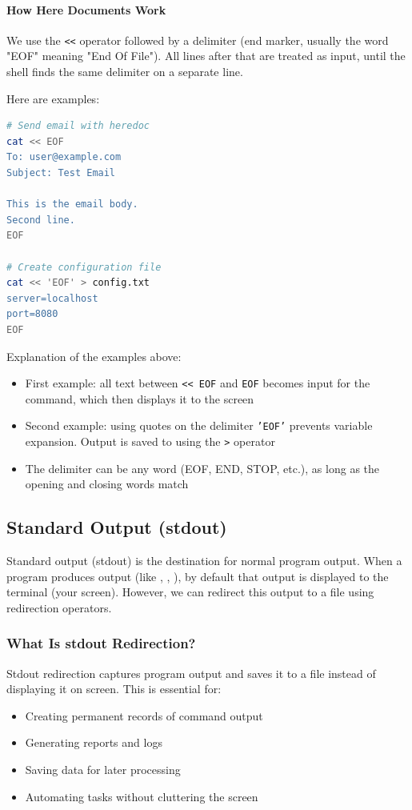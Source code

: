 \paragraph{How Here Documents Work}

We use the \texttt{<<} operator followed by a delimiter (end marker, usually the word "EOF" meaning "End Of File"). All lines after that are treated as input, until the shell finds the same delimiter on a separate line.

Here are examples:

\begin{lstlisting}[language=bash, caption={Using here document}]
# Send email with heredoc
cat << EOF
To: user@example.com
Subject: Test Email

This is the email body.
Second line.
EOF

# Create configuration file
cat << 'EOF' > config.txt
server=localhost
port=8080
EOF
\end{lstlisting}

Explanation of the examples above:
\begin{itemize}
	\item First example: all text between \texttt{<< EOF} and \texttt{EOF} becomes input for the  command, which then displays it to the screen
	\item Second example: using quotes on the delimiter \texttt{'EOF'} prevents variable expansion. Output is saved to  using the \texttt{>} operator
	\item The delimiter can be any word (EOF, END, STOP, etc.), as long as the opening and closing words match
\end{itemize}

\subsection{Standard Output (stdout)}

Standard output (stdout) is the destination for normal program output. When a program produces output (like , , ), by default that output is displayed to the terminal (your screen). However, we can redirect this output to a file using redirection operators.

\subsubsection{What Is stdout Redirection?}

Stdout redirection captures program output and saves it to a file instead of displaying it on screen. This is essential for:
\begin{itemize}
	\item Creating permanent records of command output
	\item Generating reports and logs
	\item Saving data for later processing
	\item Automating tasks without cluttering the screen
\end{itemize}


